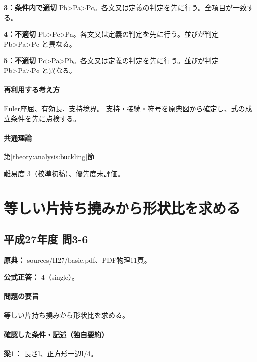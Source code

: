 \noindent\textbf{3：条件内で適切} Pb>Pa>Pc。各文又は定義の判定を先に行う。全項目が一致する。\par

\noindent\textbf{4：不適切} Pb>Pc>Pa。各文又は定義の判定を先に行う。並びが判定 Pb>Pa>Pc と異なる。\par

\noindent\textbf{5：不適切} Pc>Pa>Pb。各文又は定義の判定を先に行う。並びが判定 Pb>Pa>Pc と異なる。\par

\paragraph{再利用する考え方} Euler座屈、有効長、支持境界。 支持・接続・符号を原典図から確定し、式の成立条件を先に点検する。

\paragraph{共通理論} \hyperref[theory:analysis:buckling]{第\ref*{theory:analysis:buckling}節}

\par 難易度 3（校準初稿）、優先度未評価。

\section{等しい片持ち撓みから形状比を求める}

\subsection{平成27年度 問3-6}
\label{q:h27-reg-basic-3-6}

\noindent\textbf{原典：} sources/H27/basic.pdf、PDF物理11頁。

\textbf{公式正答：} 4（single）。

\paragraph{問題の要旨} 等しい片持ち撓みから形状比を求める。

\paragraph{確認した条件・記述（独自要約）}\mbox{}\par

\noindent\textbf{梁1：} 長さl、正方形一辺l/4。\par

